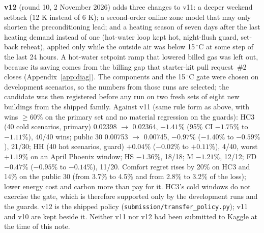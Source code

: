 \documentclass{article}
\begin{document}
\textbf{v12} (round 10, 2 November 2026) adds three changes to v11: a deeper weekend setback (12 K instead of 6 K);
a second-order online zone model that may only shorten the preconditioning lead; and a heating season of seven days
after the last heating demand instead of one (hot-water loop kept hot, night-flush guard, set-back reheat), applied only
while the outside air was below 15\,$^\circ$C at some step of the last 24 hours. A hot-water setpoint ramp that lowered
billed gas was left out, because its saving comes from the billing gap that starter-kit pull request~\#2 closes
(Appendix~\ref{app:diag}). The components and
the 15\,$^\circ$C gate were chosen on development scenarios, so the numbers from those runs are selected; the candidate
was then registered before any run on two fresh sets of eight new buildings from the shipped family. Against v11 (same
rule form as above, with wins $\geq 60\%$ on the primary set and no material regression on the guards): HC3 (40 cold
scenarios, primary) 0.02398 $\to$ 0.02364, $-1.41\%$ (95\% CI $-1.75\%$ to $-1.11\%$), 40/40 wins; public 30 0.00753
$\to$ 0.00745, $-0.97\%$ ($-1.40\%$ to $-0.59\%$), 21/30; HH (40 hot scenarios, guard) $+0.04\%$ ($-0.02\%$ to
$+0.11\%$), 4/40, worst $+1.19\%$ on an April Phoenix window; HS $-1.36\%$, 18/18; M $-1.21\%$, 12/12; FD $-0.47\%$
($-0.95\%$ to $-0.14\%$), 11/20. Comfort regret rises by 20\% on HC3 and 14\% on the public 30 (from 3.7\% to 4.5\% and
from 2.8\% to 3.2\% of the loss); lower energy cost and carbon more than pay for it. HC3's cold windows do not exercise
the gate, which is therefore supported only by the development runs and the guards. v12 is the shipped policy
(\texttt{submission/transfer\_policy.py}); v11 and v10 are kept beside it. Neither v11 nor v12 had been submitted to
Kaggle at the time of this note.
\end{document}
